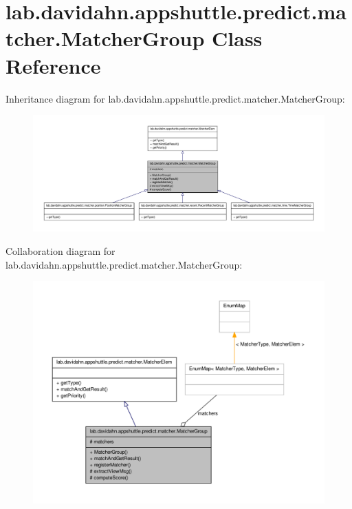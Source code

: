\hypertarget{classlab_1_1davidahn_1_1appshuttle_1_1predict_1_1matcher_1_1_matcher_group}{\section{lab.\-davidahn.\-appshuttle.\-predict.\-matcher.\-Matcher\-Group \-Class \-Reference}
\label{classlab_1_1davidahn_1_1appshuttle_1_1predict_1_1matcher_1_1_matcher_group}
}


\-Inheritance diagram for lab.\-davidahn.\-appshuttle.\-predict.\-matcher.\-Matcher\-Group\-:
\nopagebreak
\begin{figure}[H]
\begin{center}
\leavevmode
\includegraphics[width=350pt]{classlab_1_1davidahn_1_1appshuttle_1_1predict_1_1matcher_1_1_matcher_group__inherit__graph}
\end{center}
\end{figure}


\-Collaboration diagram for lab.\-davidahn.\-appshuttle.\-predict.\-matcher.\-Matcher\-Group\-:
\nopagebreak
\begin{figure}[H]
\begin{center}
\leavevmode
\includegraphics[width=350pt]{classlab_1_1davidahn_1_1appshuttle_1_1predict_1_1matcher_1_1_matcher_group__coll__graph}
\end{center}
\end{figure}
